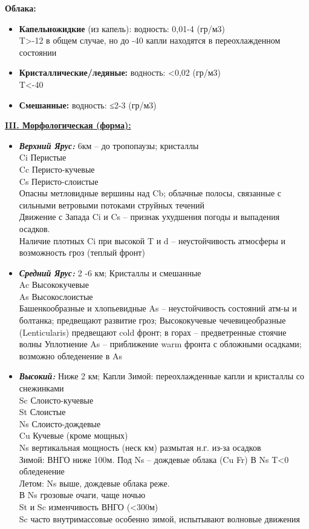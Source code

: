 \par \textbf{Облака:}
\begin{itemize}
\item \textbf{Капельножидкие} (из капель): водность: 0,01-4 (гр/м3)\\
T>-12 в общем случае, но до -40 капли находятся в переохлажденном состоянии
\item \textbf{Кристаллические/ледяные:} водность: <0,02 (гр/м3)\\
T<-40
\item \textbf{Смешанные:} водность: ≤2-3 (гр/м3)\\
\end{itemize}


\par \underline{\textbf{III. Морфологическая (форма):}}
\begin{itemize}
	\item \textit{\textbf{Верхний Ярус:}} 6км – до тропопаузы; кристаллы\\
	Ci Перистые \\
	Cc Перисто-кучевые \\
	Cs Перисто-слоистые \\
	Опасны метловидные вершины над Cb; облачные полосы, связанные с сильными ветровыми потоками струйных течений\\
	Движение  с Запада Ci и Cs – признак ухудшения погоды и выпадения осадков.\\
	Наличие плотных Ci при высокой T и d – неустойчивость атмосферы и возможность гроз (теплый фронт)
	
	\item \textbf{\textit{Средний Ярус:}} 2 -6 км; Кристаллы и смешанные\\
	Ac Высококучевые\\
	As Высокослоистые\\
	Башенкообразные и хлопьевидные As – неустойчивость состояний атм-ы и болтанка; предвещают развитие гроз;
	Высококучевые чечевицеобразные (Lenticularis) предвещают cold фронт; в горах – предветренные стоячие волны
	Уплотнение As – приближение  warm фронта с обложными осадками; возможно обледенение в As\\
	
	\item \textbf{\textit{Высокий:}} Ниже 2 км; Капли Зимой: переохлажденные капли и кристаллы со снежинками\\
	Sc Слоисто-кучевые\\
	St  Слоистые\\
	Ns Слоисто-дождевые\\
	Cu Кучевые (кроме мощных)\\
	Ns вертикальная мощность (неск км) размытая н.г. из-за осадков\\
	Зимой: ВНГО ниже 100м. Под Ns – дождевые облака (Cu Fr) {\hspace{1cm} В Ns T<0 обледенение}\\
	Летом: Ns выше, дождевые облака реже.\\
	В Ns грозовые очаги, чаще ночью\\
	St и Sc изменчивость ВНГО (<300м)\\
	Sc часто внутримассовые особенно зимой, испытывают волновые движения
	

\end{itemize}
